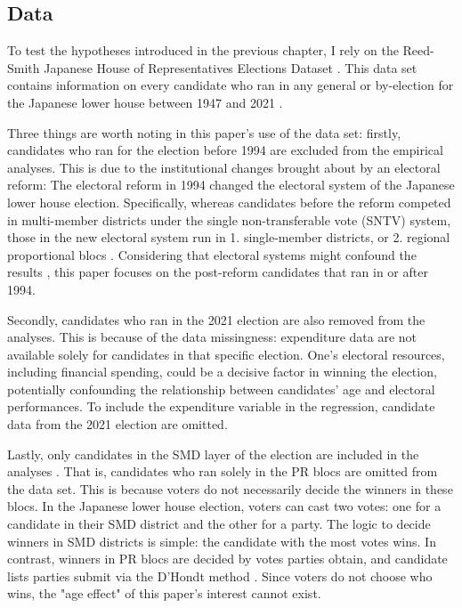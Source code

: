 \documentclass[a4paper, 12pt]{article}\usepackage[dvipdfmx]{graphicx}\usepackage[]{xcolor}
\begin{document}
\subsection{Data} \label{ch4.1}

To test the hypotheses introduced in the previous chapter, I rely on the Reed-Smith Japanese House of Representatives Elections Dataset \citep{reedsmith2018}. This data set contains information on every candidate who ran in any general or by-election for the Japanese lower house between 1947 and 2021 \footnotemark{}. 


Three things are worth noting in this paper's use of the data set: firstly, candidates who ran for the election before 1994 are excluded from the empirical analyses. This is due to the institutional changes brought about by an electoral reform:  The electoral reform in 1994 changed the electoral system of the Japanese lower house election. Specifically, whereas candidates before the reform competed in multi-member districts under the single non-transferable vote (SNTV) system, those in the new electoral system run in 1. single-member districts, or 2. regional proportional blocs \footnotemark{}. Considering that electoral systems might confound the results \citep{joshi2013representation}, this paper focuses on the post-reform candidates that ran in or after 1994. 


Secondly, candidates who ran in the 2021 election are also removed from the analyses. This is because of the data missingness: expenditure data are not available solely for candidates in that specific election. One's electoral resources, including financial spending, could be a decisive factor in winning the election, potentially confounding the relationship between candidates' age and electoral performances. To include the expenditure variable in the regression, candidate data from the 2021 election are omitted. 

Lastly, only candidates in the SMD layer of the election are included in the analyses \footnotemark{}. That is, candidates who ran solely in the PR blocs are omitted from the data set. This is because voters do not necessarily decide the winners in these blocs. In the Japanese lower house election, voters can cast two votes: one for a candidate in their SMD district and the other for a party. The logic to decide winners in SMD districts is simple: the candidate with the most votes wins. In contrast, winners in PR blocs are decided by votes parties obtain, and candidate lists parties submit via the D'Hondt method \citep{jpelection}. Since voters do not choose who wins, the "age effect" of this paper's interest cannot exist. 
\end{document}
